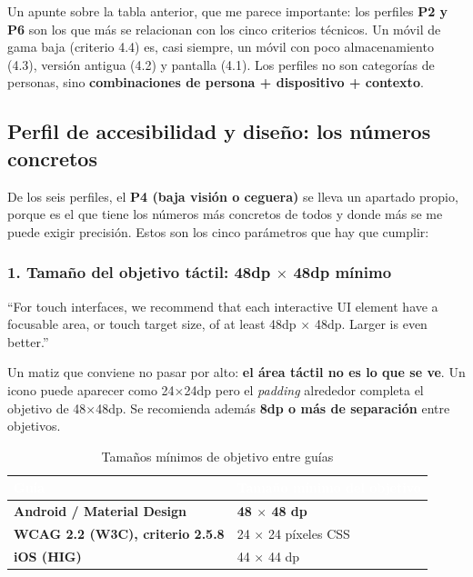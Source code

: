 Un apunte sobre la tabla anterior, que me parece importante: los perfiles \textbf{P2 y P6} son los que más se relacionan con los cinco criterios técnicos. Un móvil de gama baja (criterio 4.4) es, casi siempre, un móvil con poco almacenamiento (4.3), versión antigua (4.2) y pantalla  (4.1). Los perfiles no son categorías de personas, sino \textbf{combinaciones de persona + dispositivo + contexto}.

\subsection{Perfil de accesibilidad y diseño: los números concretos}

De los seis perfiles, el \textbf{P4 (baja visión o ceguera)} se lleva un apartado propio, porque es el que tiene los números más concretos de todos y donde más se me puede exigir precisión. Estos son los cinco parámetros que hay que cumplir:

\subsubsection*{1. Tamaño del objetivo táctil: 48dp $\times$ 48dp mínimo}

\enquote{For touch interfaces, we recommend that each interactive UI element have a focusable area, or touch target size, of at least 48dp $\times$ 48dp. Larger is even better.}

Un matiz que conviene no pasar por alto: \textbf{el área táctil no es lo que se ve}. Un icono puede aparecer como 24$\times$24dp pero el \emph{padding} alrededor completa el objetivo de 48$\times$48dp. Se recomienda además \textbf{8dp o más de separación} entre objetivos.

\begin{table}[htbp]
\centering
\small
\begin{tabular}{@{}l l@{}}
\toprule
\rowcolor{primary}
\textcolor{white}{\sffamily\bfseries Guía} & \textcolor{white}{\sffamily\bfseries Tamaño mínimo del objetivo} \\
\midrule
\textbf{Android / Material Design} & \textbf{48 $\times$ 48 dp} \\
\rowcolor{soft}
\textbf{WCAG 2.2 (W3C), criterio 2.5.8} & 24 $\times$ 24 píxeles CSS \\
\textbf{iOS (HIG)} & 44 $\times$ 44 dp \\
\bottomrule
\end{tabular}
\caption{Tamaños mínimos de objetivo entre guías}
\end{table}

